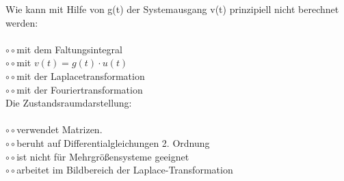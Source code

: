 \documentclass[A4]{scrartcl}
\begin{document}
  Wie kann mit Hilfe von g(t) der Systemausgang v(t) prinzipiell nicht berechnet werden:\\\\
  $\circ\circ$mit dem Faltungsintegral \\
  $\circ\circ$mit $v(t) = g(t) \cdot u(t)$\\
  $\circ\circ$mit der Laplacetransformation\\
  $\circ\circ$mit der Fouriertransformation\\

  \newpage
  Die Zustandsraumdarstellung:\\\\
  $\circ\circ$verwendet Matrizen.\\
  $\circ\circ$beruht auf Differentialgleichungen 2. Ordnung\\
  $\circ\circ$ist nicht für Mehrgrößensysteme geeignet\\
  $\circ\circ$arbeitet im Bildbereich der Laplace-Transformation\\
\end{document}
